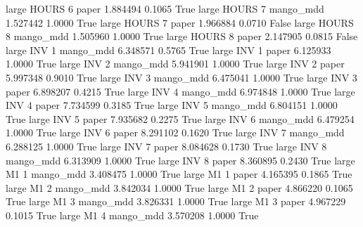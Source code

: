      large    HOURS                 6                 paper      1.884494      0.1065    True
     large    HOURS                 7             mango_mdd      1.527442      1.0000    True
     large    HOURS                 7                 paper      1.966884      0.0710   False
     large    HOURS                 8             mango_mdd      1.505960      1.0000    True
     large    HOURS                 8                 paper      2.147905      0.0815   False
     large      INV                 1             mango_mdd      6.348571      0.5765    True
     large      INV                 1                 paper      6.125933      1.0000    True
     large      INV                 2             mango_mdd      5.941901      1.0000    True
     large      INV                 2                 paper      5.997348      0.9010    True
     large      INV                 3             mango_mdd      6.475041      1.0000    True
     large      INV                 3                 paper      6.898207      0.4215    True
     large      INV                 4             mango_mdd      6.974848      1.0000    True
     large      INV                 4                 paper      7.734599      0.3185    True
     large      INV                 5             mango_mdd      6.804151      1.0000    True
     large      INV                 5                 paper      7.935682      0.2275    True
     large      INV                 6             mango_mdd      6.479254      1.0000    True
     large      INV                 6                 paper      8.291102      0.1620    True
     large      INV                 7             mango_mdd      6.288125      1.0000    True
     large      INV                 7                 paper      8.084628      0.1730    True
     large      INV                 8             mango_mdd      6.313909      1.0000    True
     large      INV                 8                 paper      8.360895      0.2430    True
     large       M1                 1             mango_mdd      3.408475      1.0000    True
     large       M1                 1                 paper      4.165395      0.1865    True
     large       M1                 2             mango_mdd      3.842034      1.0000    True
     large       M1                 2                 paper      4.866220      0.1065    True
     large       M1                 3             mango_mdd      3.826331      1.0000    True
     large       M1                 3                 paper      4.967229      0.1015    True
     large       M1                 4             mango_mdd      3.570208      1.0000    True
